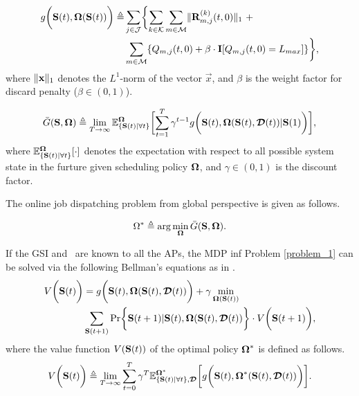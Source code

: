 \begin{definition}
    \begin{align}
        g\Paren{\Stat(t), \Policy(\Stat(t))} \define
            &\sum_{j\in\jSpace} \Brace{
                \sum_{k\in\apSet} \sum_{m\in\esSet} \Inorm{\vec{R}^{(k)}_{m,j}(t,0)}~+
                \nonumber\\
                &\sum_{m\in\esSet} \{ Q_{m,j}(t,0) + \beta \cdot \mat{I}[Q_{m,j}(t,0)=L_{max}] \}
            },
    \end{align}
    where $\lVert\mathbf{x}\|_1$ denotes the $L^1$-norm of the vector $\vec{x}$, and $\beta$ is the weight factor for discard penalty ($\beta \in (0,1)$).
\end{definition}

\begin{definition}
    \begin{align}
        \bar{G}(\Stat, \Policy) \define \lim_{T \to \infty} \mathbb{E}^{\Policy}_{\set{\Stat(t)|\forall t}} \Bracket{
            \sum_{t=1}^{T} \gamma^{t-1} g\Paren{
                \Stat(t), \Policy(\Stat(t), \Delay(t)) | \Stat(1)
            }
        },
    \end{align}
    where $\mathbb{E}^{\boldsymbol{\Omega}}_{\{\mathbf{S}(t)|\forall t\}}[\cdot]$ denotes the expectation with respect to all possible system state in the furture given scheduling policy $\boldsymbol{\Omega}$, and $\gamma \in (0,1)$ is the discount factor.
\end{definition}
The online job dispatching problem from global perspective is given as follows.
\begin{problem}
    \begin{align}
        \Omega^{*} \triangleq \arg\min_{\boldsymbol{\Omega}} \bar{G}(\mathbf{S}, \boldsymbol{\Omega}).
    \end{align}
    \label{problem_1}
\end{problem}

If the GSI and \brlatency~are known to all the APs, the MDP inf Problem \ref{problem_1} can be solved via the following Bellman's equations as in \cite{sutton1998}.
\begin{align}
    V\Paren{\Stat(t)} &=g\Paren{\Stat(t), \Policy(\Stat(t), \Delay(t))}
        + \gamma \min_{\Policy(\Stat(t))}
        \nonumber\\
        &\sum_{\Stat(t+1)} \Pr\Brace{ \Stat(t+1)|\Stat(t), \Policy(\Stat(t), \Delay(t)) } \cdot V\Paren{\Stat(t+1)},
    \label{eqn:sp_0}
\end{align}
where the value function $V(\mathbf{S}(t))$ of the optimal policy $\boldsymbol{\Omega}^{*}$ is defined as follows.
\begin{align}
    V\bigg(\mathbf{S}(t)\bigg) \triangleq \lim_{T\to\infty} \sum_{t=0}^{T} \gamma^{T}
    \mathbb{E}^{\boldsymbol{\Omega}^*}_{\{\mathbf{S}(t)|\forall t\}, \boldsymbol{\mathcal{D}}} \bigg[
        g\bigg( \mathbf{S}(t), \boldsymbol{\Omega}^{*}(\mathbf{S}(t), \boldsymbol{\mathcal{D}}(t)) \bigg)
    \bigg].
\end{align}


